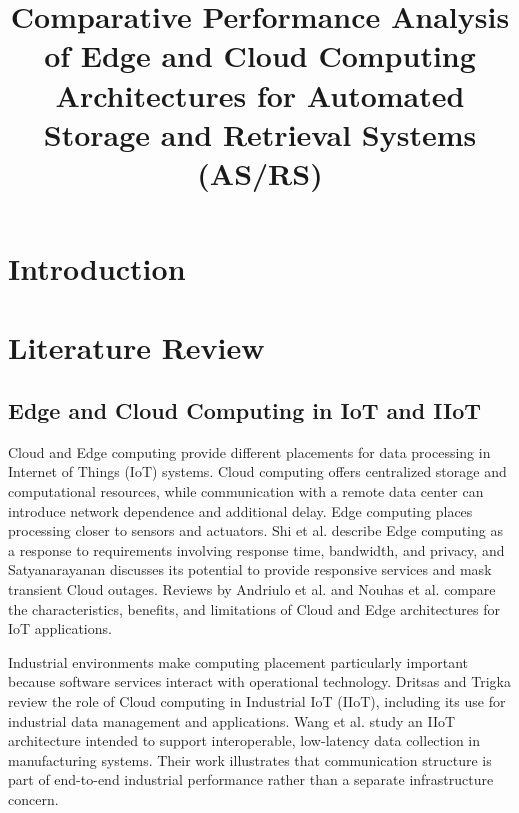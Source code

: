 \documentclass[conference]{IEEEtran}
\begin{document}
\title{Comparative Performance Analysis of Edge and Cloud Computing Architectures for Automated Storage and Retrieval Systems (AS/RS)}

\author{
}

\maketitle

\begin{abstract}
\end{abstract}

\begin{IEEEkeywords}
\end{IEEEkeywords}

\section{Introduction}

\section{Literature Review}

\subsection{Edge and Cloud Computing in IoT and IIoT}
Cloud and Edge computing provide different placements for data processing in Internet of Things (IoT) systems. Cloud computing offers centralized storage and computational resources, while communication with a remote data center can introduce network dependence and additional delay. Edge computing places processing closer to sensors and actuators. Shi et al. \cite{shi2016} describe Edge computing as a response to requirements involving response time, bandwidth, and privacy, and Satyanarayanan \cite{satyanarayanan2017} discusses its potential to provide responsive services and mask transient Cloud outages. Reviews by Andriulo et al. \cite{andriulo2024} and Nouhas et al. \cite{nouhas2023} compare the characteristics, benefits, and limitations of Cloud and Edge architectures for IoT applications.

Industrial environments make computing placement particularly important because software services interact with operational technology. Dritsas and Trigka \cite{dritsas2025} review the role of Cloud computing in Industrial IoT (IIoT), including its use for industrial data management and applications. Wang et al. \cite{wang2022} study an IIoT architecture intended to support interoperable, low-latency data collection in manufacturing systems. Their work illustrates that communication structure is part of end-to-end industrial performance rather than a separate infrastructure concern.
\end{document}
